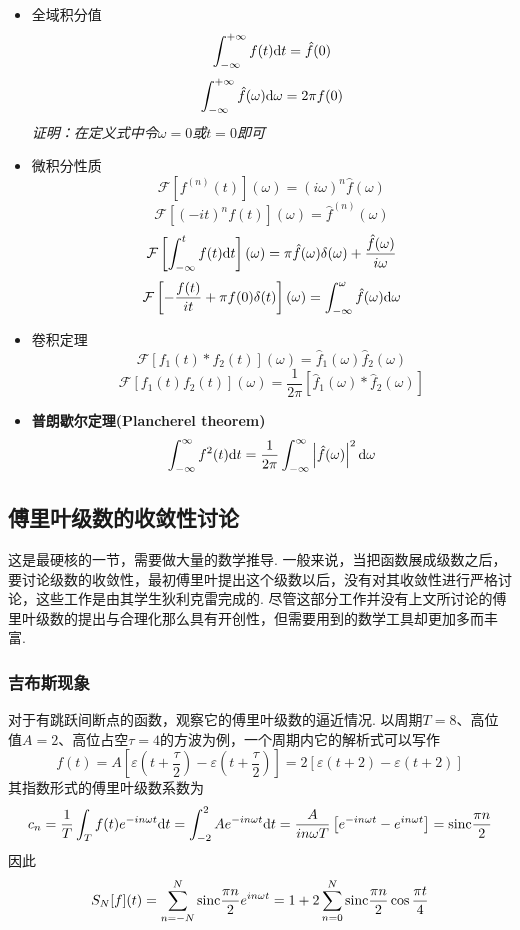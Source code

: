 \begin{itemize}
    \item [(6)] 全域积分值
    \[ \int_{-\infty}^{+\infty}f(t){\rm d}t = \hat{f}(0)\]
    \[ \int_{-\infty}^{+\infty}\hat{f}(\omega){\rm d}\omega = 2\pi f(0)\]
    \textit{证明：在定义式中令\(\omega=0\)或\(t=0\)即可}
    \item [(7)] 微积分性质
    \[ \mathcal{F}\left[f^{(n)}(t)\right](\omega) = (i\omega)^n \hat{f}(\omega) \]
    \[ \mathcal{F}\left[(-it)^nf(t)\right](\omega) = \hat{f}^{(n)}(\omega)\]
    \[ \mathcal{F}\left[\int_{-\infty}^t f(t){\rm d}t\right](\omega) = \pi \hat{f}(\omega)\delta(\omega)+\frac{\hat{f}(\omega)}{i\omega}\]
    \[ \mathcal{F}\left[-\frac{f(t)}{it}+\pi f(0)\delta(t)\right](\omega) = \int_{-\infty}^\omega \hat{f}(\omega){\rm d}\omega\]
    \item [(8)] 卷积定理
    \[ \mathcal{F}\left[f_1(t)*f_2(t)\right](\omega) = \hat{f}_1(\omega)\hat{f}_2(\omega)\]
    \[ \mathcal{F}\left[f_1(t)f_2(t)\right](\omega) = \frac{1}{2\pi}[\hat{f}_1(\omega) * \hat{f}_2(\omega)]\]
    \item [(9)] \textbf{普朗歇尔定理(Plancherel theorem)}
    \[\int_{-\infty}^{\infty}f^2(t){\rm d}t = \frac{1}{2\pi}\int_{-\infty}^{\infty}\left|\hat{f}(\omega)\right|^2{\rm d}\omega\]
\end{itemize}

\subsection{傅里叶级数的收敛性讨论}

这是最硬核的一节，需要做大量的数学推导. 一般来说，当把函数展成级数之后，要讨论级数的收敛性，最初傅里叶提出这个级数以后，没有对其收敛性进行严格讨论，这些工作是由其学生狄利克雷完成的. 尽管这部分工作并没有上文所讨论的傅里叶级数的提出与合理化那么具有开创性，但需要用到的数学工具却更加多而丰富.

\subsubsection{吉布斯现象}

对于有跳跃间断点的函数，观察它的傅里叶级数的逼近情况. 以周期\(T=8\)、高位值\(A=2\)、高位占空\(\tau=4\)的方波为例，一个周期内它的解析式可以写作
\[f(t)=A\left[\varepsilon\left(t+\frac{\tau}{2}\right)-\varepsilon\left(t+\frac{\tau}{2}\right)\right]=2\left[\varepsilon\left(t+2\right)-\varepsilon\left(t+2\right)\right]\]
其指数形式的傅里叶级数系数为 
\[c_n=\frac{1}{T}\int_{T}f(t)e^{-in\omega t}{\rm d}t=\int_{-2}^{2}Ae^{-in\omega t}{\rm d}t = \frac{A}{in\omega T}\left[e^{-in\omega t}-e^{in\omega t}\right] = {\rm sinc}\frac{\pi n}{2}\]
因此
\[S_N[f](t) = \sum_{n=-N}^{N}{\rm sinc}\frac{\pi n}{2}e^{in\omega t} = 1+2\sum_{n=0}^{N}{\rm sinc}\frac{\pi n}{2}\cos\frac{\pi t}{4}\]

